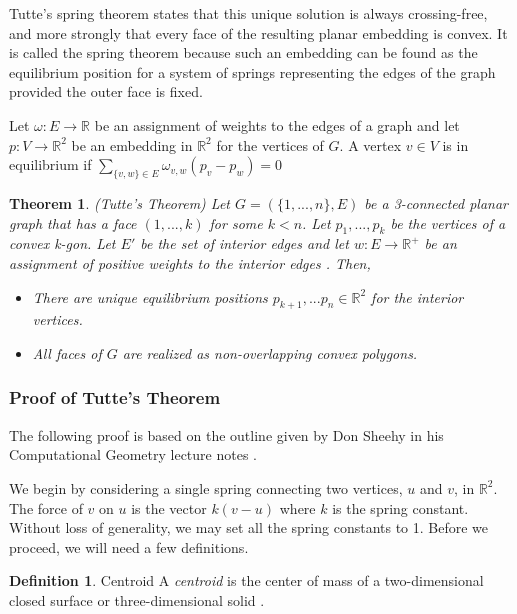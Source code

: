 \documentclass[11pt]{article}
\newcommand{\R}{\mathbb{R}}
\newtheorem{theorem}{Theorem}[section]
\theoremstyle{definition}
\newtheorem{definition}{Definition}[section]
\begin{document}
	Tutte's spring theorem states that this unique solution is always crossing-free, and more strongly that every face of the resulting planar embedding is convex. 
	It is called the spring theorem because such an embedding can be found as the equilibrium position for a system of springs representing the edges of the graph provided the outer face is fixed.
 
	Let $\omega : E \rightarrow \R$ be an assignment of weights to the edges of a graph and let $p:V \rightarrow \R^2$ be an embedding in $\R^2$ for the vertices of $G$. 
	A vertex $v \in V$ is in equilibrium if  $\sum\limits_{\{v,w\} \in E} \omega_{v,w}(p_v - p_w) = 0$
 
 	\begin{theorem}{(Tutte's Theorem)}
 		Let $G = (\{1,...,n\},E)$ be a 3-connected planar graph that has a face $(1,...,k)$ for some $k<n$. Let $p_1,...,p_k$ be the vertices of a convex k-gon. 
		Let $E'$ be the set of interior edges and let $w : E \rightarrow \R^+$ be an assignment of positive weights to the interior edges \cite{realizationSpaces}. Then,
 		\begin{itemize}
			\item There are unique equilibrium positions $p_{k+1}, ...p_n \in \R^2$ for the interior vertices. 
			\item All faces of $G$ are realized as non-overlapping convex polygons.
		\end{itemize}
	\end{theorem}

\subsubsection{Proof of Tutte's Theorem}
	The following proof is based on the outline given by Don Sheehy in his Computational Geometry lecture notes \cite{donTutte}.
	
	We begin by considering a single spring connecting two vertices, $u$ and $v$, in $\R^2$. 
	The force of $v$ on $u$ is the vector $k(v-u)$ where $k$ is the spring constant.
	Without loss of generality, we may set all the spring constants to 1.
	Before we proceed, we will need a few definitions.
	
	\theoremstyle{definition}
	\begin{definition}{Centroid}
		A \emph{centroid} is the center of mass of a two-dimensional closed surface or three-dimensional solid \cite{mathworld:Centroid}.
	\end{definition}
	
\end{document}
